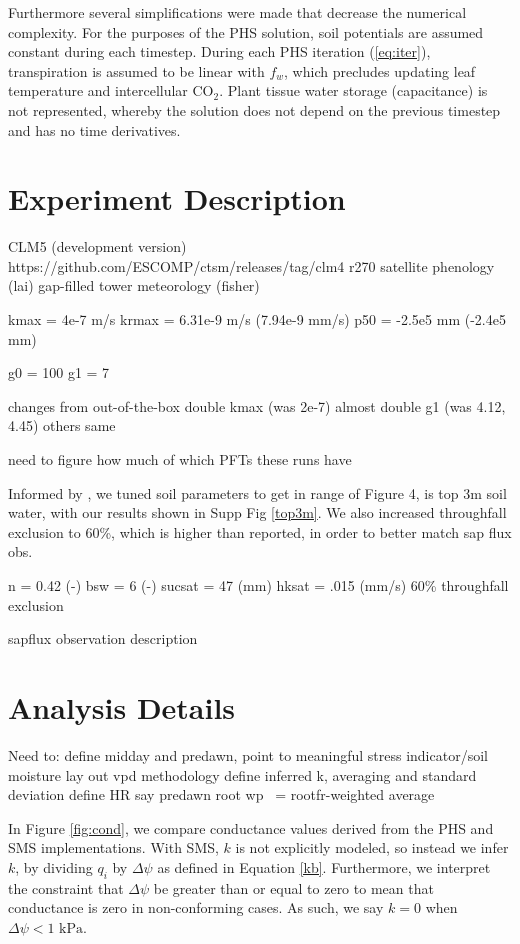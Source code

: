 \documentclass[draft,linenumbers]{agujournal}
\begin{document}
    Furthermore several simplifications were made that decrease the numerical complexity.
    For the purposes of the PHS solution, soil potentials are assumed constant during each timestep.
    During each PHS iteration (\ref{eq:iter}), transpiration is assumed to be linear with $f_w$,
    which precludes updating leaf temperature and intercellular CO$_2$.
    Plant tissue water storage (capacitance) is not represented, whereby the solution does not
    depend on the previous timestep and has no time derivatives.

\section{Experiment Description}
CLM5 (development version) 
https://github.com/ESCOMP/ctsm/releases/tag/clm4
\textunderscore r270
satellite phenology (lai)
gap-filled tower meteorology (fisher)

kmax =  4e-7 m/s
krmax = 6.31e-9 m/s (7.94e-9 mm/s)
p50 = -2.5e5 mm (-2.4e5 mm)

g0 = 100
g1 = 7

changes from out-of-the-box
double kmax (was 2e-7)
almost double g1 (was 4.12, 4.45)
others same

need to figure how much of which PFTs these runs have

Informed by \cite{fisher2008}, we tuned soil parameters to get in range of 
\cite{fisher2007} Figure 4, is top 3m soil water, with our results shown in Supp Fig \ref{top3m}.
We also increased throughfall exclusion to 60\%, which is higher than reported, in order to better match sap flux obs.

n = 0.42 (-)
bsw = 6 (-)
sucsat = 47 (mm)
hksat = .015 (mm/s)
60\% throughfall exclusion

sapflux observation description

\section{Analysis Details}  
Need to:
define midday and predawn, point to meaningful stress indicator/soil moisture
lay out vpd methodology
define inferred k, averaging and standard deviation
define HR
say predawn root wp ~= rootfr-weighted average

    In Figure \ref{fig:cond}, we compare conductance values derived from the PHS and SMS implementations.
    With SMS, $k$ is not explicitly modeled, so instead we infer $k$, 
    by dividing $q_i$ by $\Delta\psi$ as defined in Equation \ref{kb}.
    Furthermore, we interpret the constraint that $\Delta\psi$ be greater than or equal to zero to mean 
    that conductance is zero in non-conforming cases. As such, we say $k=0$ when $\Delta\psi<\text{1 kPa}$.
    
\end{document}
